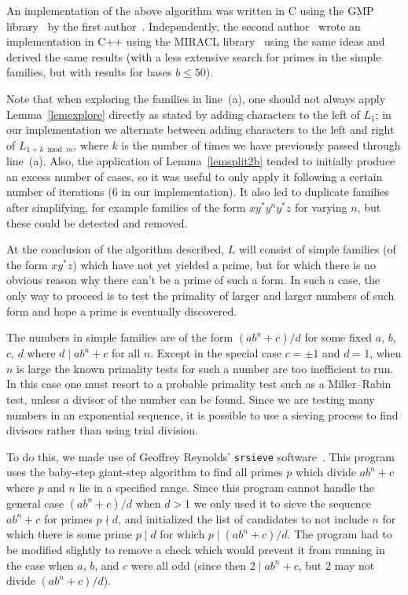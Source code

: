 \documentclass[12pt]{article}
\theoremstyle{plain}
\theoremstyle{definition}
\newcommand{\0}{\mathtt{0}}
\newcommand{\1}{\mathtt{1}}
\newcommand{\2}{\mathtt{2}}
\newcommand{\3}{\mathtt{3}}
\newcommand{\4}{\mathtt{4}}
\newcommand{\5}{\mathtt{5}}
\newcommand{\6}{\mathtt{6}}
\newcommand{\7}{\mathtt{7}}
\newcommand{\8}{\mathtt{8}}
\newcommand{\9}{\mathtt{9}}
\newcommand{\updated}[1]{{\color{red}#1}}
\renewcommand{\updated}[1]{#1}
\begin{document}
An implementation of the above algorithm was written in C using the GMP library~\cite{gmp} by the first author~\cite{code}.
\updated{Independently, the second author~\cite{devillers} wrote an implementation in C++ using the MIRACL library~\cite{miracl} using the same ideas and derived the same results (with a less extensive search for primes in the simple families, but with results for bases $b\leq50$).}

Note that when exploring the families in line~(a), one should not always apply Lemma~\ref{lemexplore} directly as stated by adding
characters to the left of $L_1$; in our implementation we alternate between adding characters
to the left and right of $L_{1+k\bmod m}$, where $k$ is the number of times we have previously passed through line~(a).
Also, the application of Lemma~\ref{lemsplit2b} tended to initially
produce an excess number of cases, so it was useful to only apply it following a certain number of iterations (6 in our implementation).
It also led to duplicate families after simplifying, for example families of the form $xy^*y^ny^*z$ for varying $n$,
but these could be detected and removed.

At the conclusion of the algorithm described, $L$ will consist of simple families (of the form $xy^*z$) which have not yet
yielded a prime, but for which there is no obvious reason why there can't be a prime of such a form.
In such a case, the only way to proceed is to test the primality of larger and larger numbers of such form and hope
a prime is eventually discovered.

The numbers in simple families are of the form $(ab^n+c)/d$ for some fixed $a$, $b$, $c$, $d$ where $d\mid ab^n+c$ for all $n$.
Except in the special case $c=\pm1$ and $d=1$, when $n$ is large the known primality tests for such a number are too inefficient to run.
In this case one must resort to a probable primality test such as a Miller--Rabin test, unless a divisor of the number can be found.
Since we are testing many numbers in an exponential sequence, it is possible to use a sieving process to find divisors
rather than using trial division.

To do this, we made use of Geoffrey Reynolds' 
{\tt srsieve} software~\cite{srsieve}.
This program uses the baby-step giant-step
algorithm to find all primes $p$ which divide $ab^n+c$ where $p$ and $n$ lie in a specified range.  Since this program cannot
handle the general case $(ab^n+c)/d$ when $d>1$ we only used it to sieve the sequence $ab^n+c$ for primes $p\nmid d$, and initialized the list of candidates to not include $n$ for which there is some prime $p\mid d$ for which $p\mid(ab^n+c)/d$.
The program had to be modified slightly to remove a check which would prevent it from running in the case when $a$, $b$, and $c$ were all odd (since then $2\mid ab^n+c$\updated{, but $2$ may not divide $(ab^n+c)/d$}).
\end{document}
